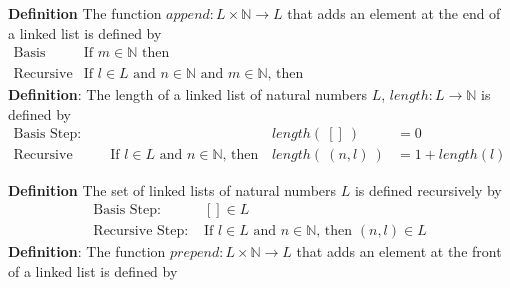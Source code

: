 \documentclass[12pt, oneside]{article}
\begin{document}
{\bf Definition} The function $append : L \times \mathbb{N} \to L$ that 
adds an element at the end of a linked list is defined by
\[
\begin{array}{llll}
\textrm{Basis Step:} & \textrm{If } m \in \mathbb{N}\textrm{ then } & \phantom{append(~([], m)~)} & \phantom{= (m, []) }\\
\textrm{Recursive Step:} & \textrm{If } l \in L\textrm{ and }n \in \mathbb{N}\textrm{ and }m \in \mathbb{N}\textrm{, then  } & \phantom{append(~(~(n, l), m~)~) } &\phantom{= (n, append(~(l, m)~)~)}
\end{array}
\]
{\bf Definition}: The length of a linked list of natural numbers $L$, $length: L \to \mathbb{N}$ is defined by
\[
\begin{array}{llll}
\textrm{Basis Step:} &  & length(~[]~) &= 0 \\
\textrm{Recursive Step:} & \textrm{If } l \in L\textrm{ and }n \in \mathbb{N}\textrm{, then  } & length(~(n, l)~)  &= 1+ length(l)
\end{array}
\]

{\bf Definition} The set of linked lists of natural numbers $L$ is defined recursively by
\[
\begin{array}{ll}
    \textrm{Basis Step: } & [] \in L \\
    \textrm{Recursive Step: } & \textrm{If } l \in L\textrm{ and }n \in \mathbb{N} \textrm{, then } (n, l) \in L
\end{array}
\]
{\bf Definition}: The function $prepend : L \times \mathbb{N} \to L$ that adds an element at the 
front of a linked list is defined by
\[
\phantom{prepend(~(l, n)~) = (n, l)}
\]
\end{document}
